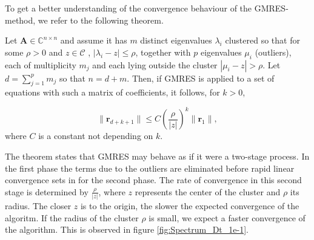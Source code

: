 To get a better understanding of the convergence behaviour of the GMRES-method, we refer to the following theorem.
\begin{Theorem}
Let $ \mathbf{A} \in \mathbb{C}^{n\times n}$ and assume it has $m$ distinct eigenvalues $\lambda_i$ clustered so that for some $\rho > 0 $ and $z \in \mathcal{C}$ , $|\lambda_i - z| \leq \rho$, together with $p$ eigenvalues $\mu_i$ (outliers), each of multiplicity $m_j$ and each lying outside the cluster $|\mu_i - z| > \rho$. Let $d= \sum_{j=1}^p m_j$  so that $n= d+m$. Then, if GMRES is applied to a set of equations with such a matrix of coefficients, it follows, for $k>0$,

\begin{equation}
\| \mathbf{r}_{d+k+1} \| \leq C  \left( \frac{\rho}{|z|} \right)^k  \| \mathbf{r}_1 \| ,
\end{equation}
where $C$ is a constant not depending on $k$.
\end{Theorem}

The theorem states that GMRES may behave as if it were a two-stage process. In the first phase the terms due to the outliers are eliminated before rapid linear convergence sets in for the second phase. The rate of convergence in this second stage is determined by $\frac{\rho}{\lvert z\lvert}$, where $z$ represents the center of the cluster and  $\rho$ its radius. The closer $z$ is to the origin, the slower the expected convergence of the algoritm. If the radius of the cluster $\rho$ is small, we expect a faster convergence of the algorithm. This is observed in figure \ref{fig:Spectrum_Dt_1e-1}.


